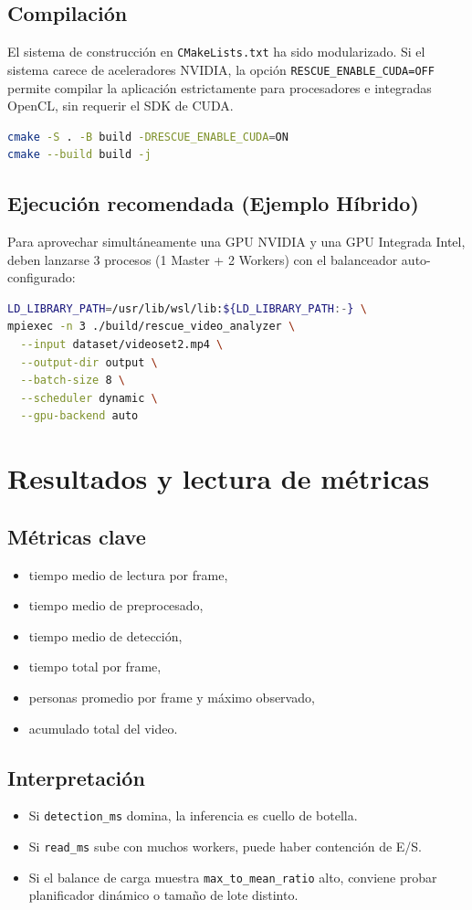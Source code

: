 \documentclass[11pt,a4paper]{article}
\begin{document}
\subsection{Compilaci\'on}
El sistema de construcci\'on en \texttt{CMakeLists.txt} ha sido modularizado. Si el sistema carece de aceleradores NVIDIA, la opci\'on \texttt{RESCUE\_ENABLE\_CUDA=OFF} permite compilar la aplicaci\'on estrictamente para procesadores e integradas OpenCL, sin requerir el SDK de CUDA.
\begin{lstlisting}[language=bash]
cmake -S . -B build -DRESCUE_ENABLE_CUDA=ON
cmake --build build -j
\end{lstlisting}

\subsection{Ejecuci\'on recomendada (Ejemplo H\'ibrido)}
Para aprovechar simult\'aneamente una GPU NVIDIA y una GPU Integrada Intel, deben lanzarse 3 procesos (1 Master + 2 Workers) con el balanceador auto-configurado:
\begin{lstlisting}[language=bash]
LD_LIBRARY_PATH=/usr/lib/wsl/lib:${LD_LIBRARY_PATH:-} \
mpiexec -n 3 ./build/rescue_video_analyzer \
  --input dataset/videoset2.mp4 \
  --output-dir output \
  --batch-size 8 \
  --scheduler dynamic \
  --gpu-backend auto
\end{lstlisting}

\section{Resultados y lectura de m\'etricas}
\subsection{M\'etricas clave}
\begin{itemize}[leftmargin=*]
  \item tiempo medio de lectura por frame,
  \item tiempo medio de preprocesado,
  \item tiempo medio de detecci\'on,
  \item tiempo total por frame,
  \item personas promedio por frame y m\'aximo observado,
  \item acumulado total del video.
\end{itemize}

\subsection{Interpretaci\'on}
\begin{itemize}[leftmargin=*]
  \item Si \texttt{detection\_ms} domina, la inferencia es cuello de botella.
  \item Si \texttt{read\_ms} sube con muchos workers, puede haber contenci\'on de E/S.
  \item Si el balance de carga muestra \texttt{max\_to\_mean\_ratio} alto, conviene probar planificador din\'amico o tama\~no de lote distinto.
\end{itemize}
\end{document}

